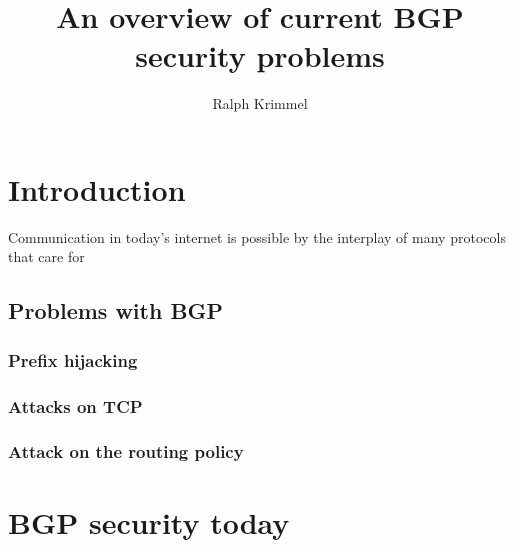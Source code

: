 \documentclass[]{IEEEtran}
\author{Ralph Krimmel}
\title{An overview of current BGP security problems}
\begin{document}
	\maketitle
	\begin{abstract}
	\end{abstract}
	\section{Introduction}
	Communication in today's internet is possible by the interplay of many protocols that care for 

	\subsection{Problems with BGP}
		\subsubsection{Prefix hijacking}
%	
		\subsubsection{Attacks on TCP}
		\subsubsection{Attack on the routing policy} 
%
%
%
	\section{BGP security today}
%	
%
%
\end{document}
